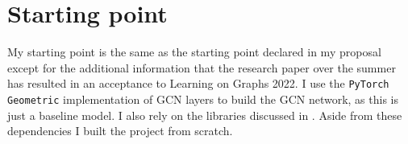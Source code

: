 
\section{Starting point}

My starting point is the same as the starting point declared in my proposal except for the additional information that the research paper over the summer has resulted in an acceptance to Learning on Graphs 2022.
I use the \texttt{PyTorch Geometric} implementation of GCN layers to build the GCN network, as this is just a baseline model. I also rely on the libraries discussed in .
Aside from these dependencies I built the project from scratch.

